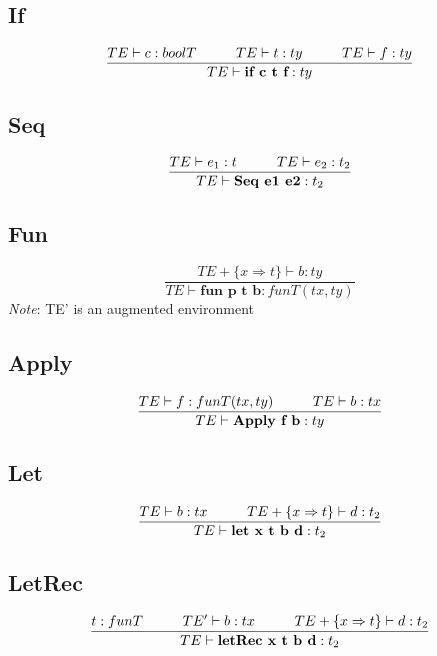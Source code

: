 \documentclass{article}
\newcommand\tab[1][1cm]{\hspace*{#1}}
\begin{document}
    \subsection{If}
         \begin{equation}
            \frac{TE \vdash c : boolT \tab TE \vdash t : ty \tab TE \vdash f : ty}{TE \vdash \textbf{if c t f} : ty}
        \end{equation}
    \subsection{Seq}
        \begin{equation}
            \frac{TE \vdash e_1 : t \tab TE \vdash e_2 : t_2}{TE \vdash \textbf{Seq e1 e2} : t_2}
        \end{equation}
    \subsection{Fun}
        \begin{equation}
            \frac{TE + \{x \Rightarrow t\} \vdash b : ty}{TE \vdash \textbf{fun p t b} : funT(tx, ty)}
        \end{equation}
        \textit{Note}: TE' is an augmented environment
    \subsection{Apply}
        \begin{equation}
            \frac{TE \vdash f : funT(tx, ty) \tab TE \vdash b : tx}{TE \vdash \textbf{Apply f b} : ty}
        \end{equation}
    \subsection{Let}
        \begin{equation}
            \frac{TE \vdash b : tx \tab TE + \{x \Rightarrow t\} \vdash d : t_2}{TE \vdash \textbf{let x t b d} : t_2}
        \end{equation}
    \subsection{LetRec}
        \begin{equation}
            \frac{t : funT \tab TE' \vdash b : tx \tab TE + \{x \Rightarrow t\} \vdash d : t_2}{TE \vdash \textbf{letRec x t b d} : t_2}
        \end{equation}
    
\end{document}
